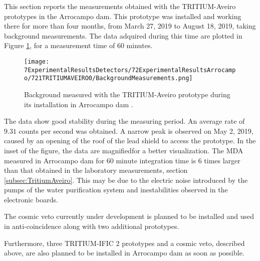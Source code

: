 This section reports the measurements obtained with the TRITIUM-Aveiro prototypes in the Arrocampo dam. This prototype was installed and working there for more than four months, from March 27, 2019 to August 18, 2019, taking background measurements. The data adquired during this time are plotted in Figure \ref{fig:BackgroundArrocampoAveiro}, for a measurement time of 60 minutes.

\begin{figure}[h]
\centering
\texttt{[image: 7ExperimentalResultsDetectors/72ExperimentalResultsArrocampo/721TRITIUMAVEIRO0/BackgroundMeasurements.png]}
\caption{Background measured with the TRITIUM-Aveiro prototype during its installation in Arrocampo dam \cite{ExperimentalPaperCarlos}.\label{fig:BackgroundArrocampoAveiro}}
\end{figure}
The data show good stability during the measuring period. An average rate of $9.31$ counts per second was obtained. A narrow peak is observed on May 2, 2019, caused by an opening of the roof of the lead shield to access the prototype. In the inset of the figure, the data are magnifiedfor a better visualization. The MDA measured in Arrocampo dam for 60 minute integration time is 6 times larger than that obtained in the laboratory measurements, section \ref{subsec:TritiumAveiro}. This may be due to the electric noise introduced by the pumps of the water purification system and inestabilities observed in the electronic boards.

The cosmic veto currently under development is planned to be installed and used in anti-coincidence along with two additional prototypes.

Furthermore, three TRITIUM-IFIC 2 prototypes and a cosmic veto, described above, are also planned to be installed in Arrocampo dam as soon as possible.